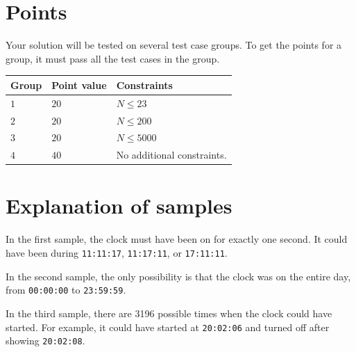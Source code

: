 \section*{Points}
Your solution will be tested on several test case groups.
To get the points for a group, it must pass all the test cases in the group.

\noindent
\begin{tabular}{| l | l | p{12cm} |}
  \hline
  \textbf{Group} & \textbf{Point value} & \textbf{Constraints} \\ \hline
  $1$    & $20$        &  $ N \leq 23 $ \\ \hline 
  $2$    & $20$        &  $ N \leq 200 $ \\ \hline
  $3$    & $20$        &  $ N \leq 5000 $ \\ \hline
  $4$    & $40$        &  No additional constraints. \\ \hline
\end{tabular}



\section*{Explanation of samples}
In the first sample, the clock must have been on for exactly one second. It could have been during \texttt{11:11:17}, \texttt{11:17:11}, or \texttt{17:11:11}.

In the second sample, the only possibility is that the clock was on the entire day, from \texttt{00:00:00} to \texttt{23:59:59}.

In the third sample, there are 3196 possible times when the clock could have started. For example, it could have started at \texttt{20:02:06} and turned off after showing \texttt{20:02:08}.
